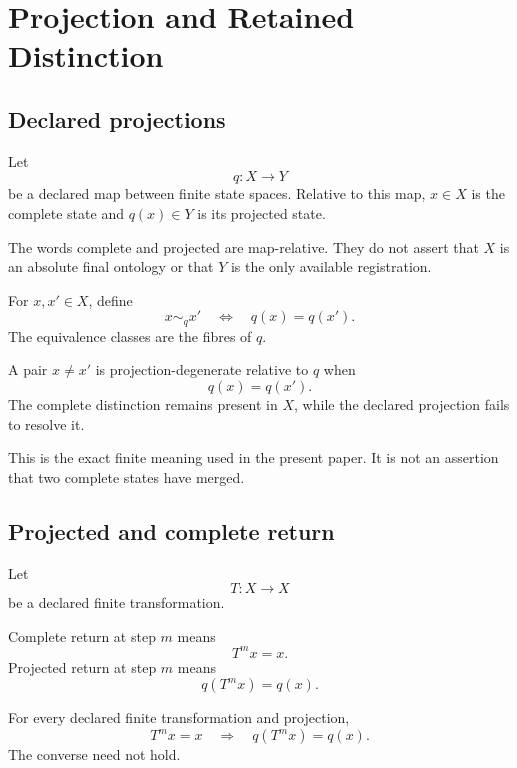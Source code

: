 \section{Projection and Retained Distinction}

\subsection{Declared projections}

\begin{definition}
Let
\[
q:X\longrightarrow Y
\]
be a declared map between finite state spaces.  Relative to this map,
\(x\in X\) is the complete state and \(q(x)\in Y\) is its projected
state.
\end{definition}

The words complete and projected are map-relative.  They do not
assert that \(X\) is an absolute final ontology or that \(Y\) is the
only available registration.

\begin{definition}
For \(x,x'\in X\), define
\[
x\sim_q x'
\quad\Longleftrightarrow\quad
q(x)=q(x').
\]
The equivalence classes are the fibres of \(q\).
\end{definition}

\begin{definition}
A pair \(x\neq x'\) is projection-degenerate relative to \(q\) when
\[
q(x)=q(x').
\]
The complete distinction remains present in \(X\), while the declared
projection fails to resolve it.
\end{definition}

This is the exact finite meaning used in the present paper.  It is
not an assertion that two complete states have merged.

\subsection{Projected and complete return}

Let
\[
T:X\longrightarrow X
\]
be a declared finite transformation.

\begin{definition}
Complete return at step \(m\) means
\[
T^{m}x=x.
\]
Projected return at step \(m\) means
\[
q(T^{m}x)=q(x).
\]
\end{definition}

\begin{proposition}
For every declared finite transformation and projection,
\[
T^{m}x=x
\quad\Longrightarrow\quad
q(T^{m}x)=q(x).
\]
The converse need not hold.
\end{proposition}

